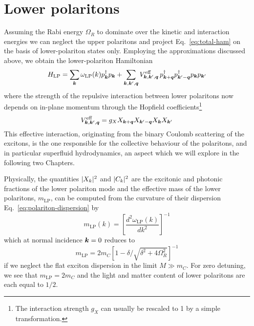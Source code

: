 \section{Lower polaritons}
\label{sec:lower-polaritons}

Assuming the Rabi energy $\Omega_R$ to dominate over the kinetic and
interaction energies we can neglect the upper polaritons and project
Eq.~\eqref{eq:total-ham} on the basis of lower-polariton states
only. Employing the approximations discussed above, we obtain the
lower-polariton Hamiltonian
%
\begin{equation}\label{eq:LP-ham}
  H_{\text{LP}} = \sum_{\bm{k}} \omega_{\text{LP}}(k) p_{\bm{k}}^{\dagger} p_{\bm{k}} + \sum_{\bm{k},\bm{k}^{\prime},\bm{q}} V^{\text{eff}}_{\bm{k},\bm{k}^{\prime},\bm{q}}\, p^{\dagger}_{\bm{k} + \bm{q}} p^{\dagger}_{\bm{k}^{\prime} - \bm{q}} p_{\bm{k}} p_{\bm{k}^{\prime}}
\end{equation}
% 
where the strength of the repulsive interaction between lower
polaritons now depends on in-plane momentum through the Hopfield
coefficients\footnote{The interaction strength $g_X$ can usually be
  rescaled to 1 by a simple transformation.}
%
\begin{equation}\label{eq:g-eff}
  V^{\text{eff}}_{\bm{k},\bm{k}^{\prime},\bm{q}} = g_X X_{\bm{k} + \bm{q}}X_{\bm{k}^{\prime} - \bm{q}}X_{\bm{k}}X_{\bm{k}^{\prime}}
\end{equation}
% 
This effective interaction, originating from the binary Coulomb
scattering of the excitons, is the one responsible for the collective
behaviour of the polaritons, and in particular superfluid
hydrodynamics, an aspect which we will explore in the following two Chapters.

Physically, the quantities $\vert X_k \vert^2$ and $\vert C_k \vert^2$ are the
excitonic and photonic fractions of the lower polariton mode and the
effective mass of the lower polaritons, $m_{\text{LP}}$, can be
computed from the curvature of their dispersion
Eq.~\eqref{eq:polariton-dispersion} by
%
\begin{equation}\label{eq:LP-mass-def}
  m_{\text{LP}}(k) = \left[\frac{d^2 \omega_{\text{LP}}(k)}{dk^2}\right]^{-1}
\end{equation}
% 
which at normal incidence $\bm{k} = 0$ reduces to 
%
\begin{equation}\label{eq:LP-mass}
  m_{\text{LP}} = 2m_C \left[1 - \delta/\sqrt{\delta^2 + 4\Omega_R^2}\right]^{-1}
\end{equation}
% 
if we neglect the flat exciton dispersion in the limit $M \gg
m_C$. For zero detuning, we see that $m_{\text{LP}} = 2m_C$ and the
light and matter content of lower polaritons are each equal to $1/2$.

